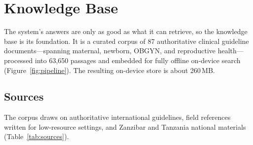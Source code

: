 \section{Knowledge Base}
\label{sec:corpus}


The system's answers are only as good as what it can retrieve, so the
knowledge base is its foundation. It is a curated corpus of 87 authoritative
clinical guideline documents---spanning maternal, newborn, OBGYN, and
reproductive health---processed into 63{,}650 passages and embedded for
fully offline on-device search (Figure~\ref{fig:pipeline}). The resulting
on-device store is about 260\,MB.

\subsection{Sources}

The corpus draws on authoritative international guidelines, field references
written for low-resource settings, and Zanzibar and Tanzania national
materials (Table~\ref{tab:sources}).

